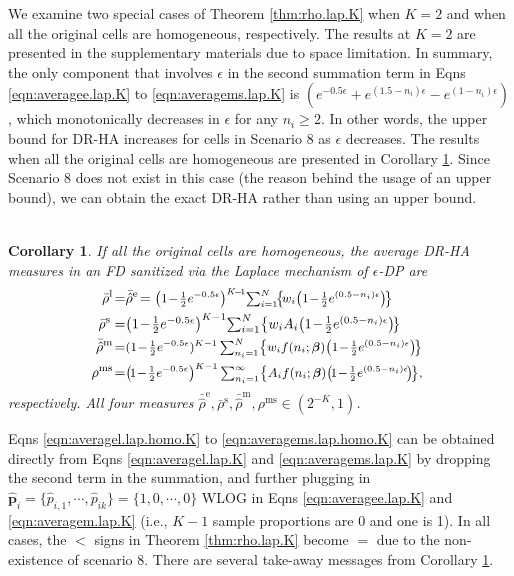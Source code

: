 \documentclass[10pt,journal,compsoc]{IEEEtran}
\newtheorem{cor}[thm]{\vspace{-6pt}\\ Corollary}
\newcommand{\bs}{\boldsymbol}
\begin{document}
We examine two special cases of Theorem \ref{thm:rho.lap.K} when $K=2$ and when all the original cells are homogeneous, respectively. The results at  $K=2$ are presented  in the supplementary materials due to space limitation. In summary, the only component that involves $\epsilon$ in the second summation term in Eqns \eqref{eqn:averagee.lap.K} to \eqref{eqn:averagems.lap.K} is $(e^{-0.5\epsilon}+e^{(1.5-n_i)\epsilon}-e^{(1-n_i)\epsilon})$, which monotonically decreases in $\epsilon$ for any $n_i\geq2$. In other words, the upper bound for DR-HA increases for cells in Scenario 8  as $\epsilon$ decreases.    The results when all the original cells are homogeneous are presented in Corollary \ref{cor:rho.lap.homo}. Since Scenario 8 does not exist in this case (the reason behind the usage of an upper bound), we can obtain the exact DR-HA rather than using an upper bound. 
\vspace{-3pt}\begin{cor}\label{cor:rho.lap.homo}
If all the original cells are homogeneous, the average DR-HA measures in an FD sanitized via the Laplace mechanism of $\epsilon$-DP are
\begin{align}
\!\!\!\bar{\rho}^{\text{l}}\!=&\bar{\hat{\rho}}^{\text{e}}\!=\mbox{\small$\textstyle\big(1\!-\!\frac{1}{2}e^{-0.5\epsilon}\big)^{K\!-\!1}\!\sum_{i=1}^N\!\!\big\{\!w_i\big(1\!-\!\frac{1}{2}e^{(0.5-n_i)\epsilon}\big)\!\big\}$}\!\label{eqn:averagel.lap.homo.K}\\
\!\!\bar\rho^{\text{s}}=&\textstyle\big(1\!-\!\frac{1}{2}e^{-0.5\epsilon}\big)^{K-1}\!\sum_{i=1}^{N}\!\big\{w_iA_i\big(1\!-\!\frac{1}{2}e^{(0.5-n_i)\epsilon}\big)\!\big\}\label{eqn:averages.lap.homo.K}\\
\!\!\!\bar{\hat{\rho}}^{\text{m}}\!=&\mbox{\small$\textstyle(1\!-\!\frac{1}{2}e^{-0.5\epsilon})^{K-1} \sum_{n_i=1}^N\!\big\{w_if(n_i;\bs\beta)\big(1\!-\!\frac{1}{2}e^{(0.5-n_i)\epsilon}\big)\!\big\}$}\!\!\label{eqn:averagem.lap.homo.K}\\
\!\!\!\rho^{\text{ms}}\!=&\mbox{\small$\textstyle\big(\!1\!-\!\frac{1}{2}e^{-0.5\epsilon}\big)^{K-1}\sum_{n_i=1}^\infty\!\big\{A_if(n_i;\bs\beta)\big(\!1\!-\!\frac{1}{2}e^{(0.5-n_i)\epsilon}\!\big)\!\big\},$}\!\label{eqn:averagems.lap.homo.K}
\end{align}
respectively. All four measures $\bar{\hat{\rho}}^{\text{e}},\bar{\rho}^{\text{s}}, \bar{\hat{\rho}}^{\text{m}},\rho^{\text{ms}}\in(2^{-K},1)$.
\end{cor}
Eqns \eqref{eqn:averagel.lap.homo.K} to \eqref{eqn:averagems.lap.homo.K} can be obtained directly from Eqns \eqref{eqn:averagel.lap.K} and \eqref{eqn:averagems.lap.K} by dropping the second term in the summation, and further plugging in  $\bs{\hat{p}}_i\!=\!\{\hat{p}_{i,1}, \cdots, \hat{p}_{ik}\}=\{1, 0, \cdots, 0\}$ WLOG in Eqns \eqref{eqn:averagee.lap.K}  and \eqref{eqn:averagem.lap.K} (i.e., $K-1$ sample proportions are 0 and one is 1). In all cases,  the $<$ signs in Theorem \ref{thm:rho.lap.K} become $=$ due to the non-existence of scenario 8. There are several  take-away messages from Corollary \ref{cor:rho.lap.homo}. 
\end{document}
